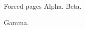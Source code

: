 \documentclass[aspectratio=169]{beamer}
\begin{document}
\begin{frame}[allowframebreaks]{Forced pages}
Alpha.\newpage
Beta.\par\framebreak
Gamma.
\end{frame}
\end{document}
